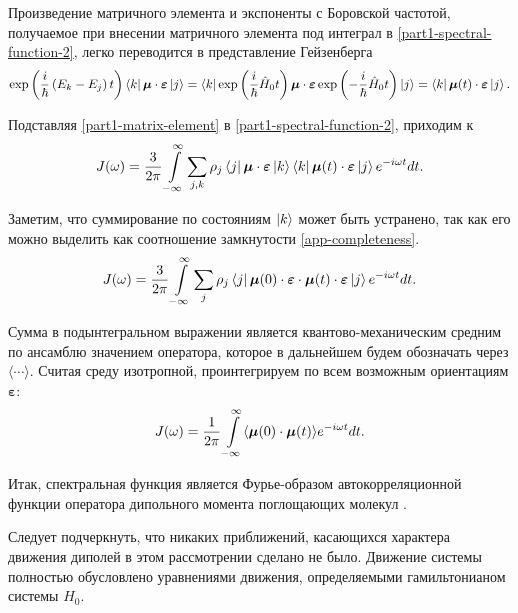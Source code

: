 Произведение матричного элемента и экспоненты с Боровской частотой, получаемое при внесении матричного элемента под интеграл в \eqref{part1-spectral-function-2}, легко переводится в представление Гейзенберга
\begin{gather}
    \exp \left( \frac{i}{\hbar} \left( E_k - E_j \right) t \right) \bra{k} \boldsymbol{\mu} \cdot \boldsymbol{\varepsilon} \ket{j} = \bra{k} \exp \left( \frac{i}{\hbar} \hat{H}_0 t \right) \boldsymbol{\mu} \cdot \boldsymbol{\varepsilon} \exp \left( -\frac{i}{\hbar} \hat{H}_0 t \right) \ket{j} = \bra{k} \boldsymbol{\mu}(t) \cdot \boldsymbol{\varepsilon} \ket{j}. \label{part1-matrix-element}
\end{gather}

Подставляя \eqref{part1-matrix-element} в \eqref{part1-spectral-function-2}, приходим к
\begin{gather}
    J(\omega) = \frac{3}{2\pi} \int\limits_{-\infty}^\infty \sum_{j,k} \rho_j \bra{j} \boldsymbol{\mu} \cdot \boldsymbol{\varepsilon} \ket{k} \bra{k} \boldsymbol{\mu}(t) \cdot \boldsymbol{\varepsilon} \ket{j} e^{-i \omega t} dt.
\end{gather}

Заметим, что суммирование по состояниям $\ket{k}$ может быть устранено, так как его можно выделить как соотношение замкнутости \eqref{app-completeness}. 
\begin{gather}
    J(\omega) = \frac{3}{2\pi} \int\limits_{-\infty}^\infty \sum_j  \rho_{j} \bra{j} \boldsymbol{\mu}(0) \cdot \boldsymbol{\varepsilon} \cdot \boldsymbol{\mu}(t) \cdot \boldsymbol{\varepsilon} \ket{j} e^{-i\omega t} dt.
\end{gather}

Сумма в подынтегральном выражении является квантово-механическим средним по ансамблю значением оператора, которое в дальнейшем будем обозначать через $\langle \cdots \rangle$. Считая среду изотропной, проинтегрируем по всем возможным ориентациям $\boldsymbol{\varepsilon}$:
\begin{gather}
    J(\omega) = \frac{1}{2\pi} \int\limits_{-\infty}^\infty \langle  \boldsymbol{\mu}(0) \cdot \boldsymbol{\mu}(t)  \rangle e^{-i \omega t} dt. \label{litreview-spectral-function}
\end{gather}

Итак, спектральная функция является Фурье-образом автокорреляционной функции оператора дипольного момента поглощающих молекул \cite{gordon1968}. \par
Следует подчеркнуть, что никаких приближений, касающихся характера движения диполей в этом рассмотрении сделано не было. Движение системы полностью обусловлено уравнениями движения, определяемыми гамильтонианом системы $\hat{H}_0$. 

